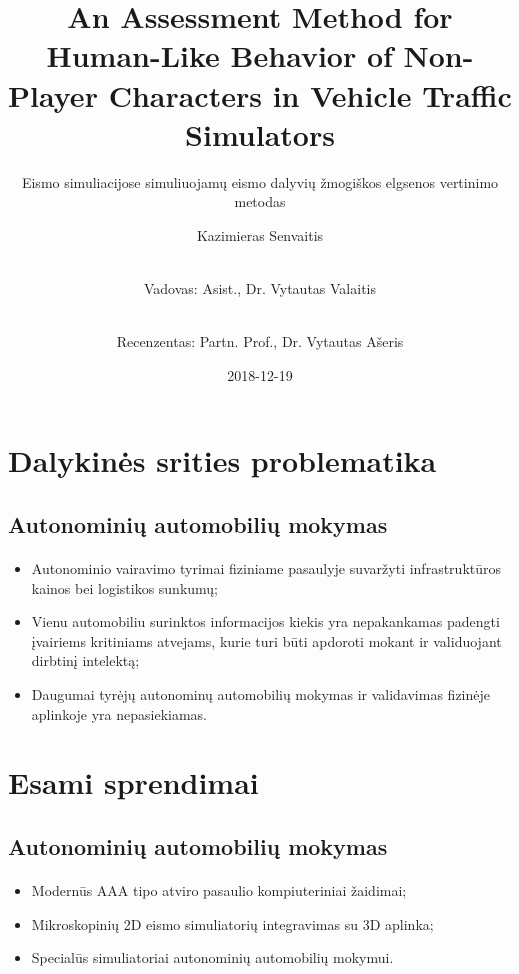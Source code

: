 \documentclass{beamer}
\title{An Assessment Method for Human-Like Behavior of Non-Player Characters in Vehicle Traffic Simulators}
\subtitle{Eismo simuliacijose simuliuojamų eismo dalyvių žmogiškos elgsenos vertinimo metodas}
\author[shortname]{Kazimieras Senvaitis \and \\ Vadovas: Asist., Dr. Vytautas Valaitis  \and \\ Recenzentas: Partn. Prof., Dr. Vytautas Ašeris}
\date{2018-12-19}
\begin{document}
	
\maketitle


\section{Dalykinės srities problematika}

\subsection{Autonominių automobilių mokymas}
\begin{frame}{\insertsection}
\framesubtitle{\insertsubsection}
\begin{itemize}
	\item Autonominio vairavimo tyrimai fiziniame pasaulyje suvaržyti infrastruktūros kainos bei logistikos sunkumų;
	\item Vienu automobiliu surinktos informacijos kiekis yra nepakankamas padengti įvairiems kritiniams atvejams, kurie turi būti apdoroti mokant ir validuojant dirbtinį intelektą;
	\item Daugumai tyrėjų autonominų automobilių mokymas ir validavimas fizinėje aplinkoje yra nepasiekiamas.
\end{itemize}
\end{frame}



\section{Esami sprendimai}

\subsection{Autonominių automobilių mokymas}
\begin{frame}{\insertsection}
\framesubtitle{\insertsubsection}
\begin{itemize}
	\item Modernūs AAA tipo atviro pasaulio kompiuteriniai žaidimai;
	\item Mikroskopinių 2D eismo simuliatorių integravimas su 3D aplinka;
	\item Specialūs simuliatoriai autonominių automobilių mokymui.
\end{itemize}
\end{frame}
\end{document}
